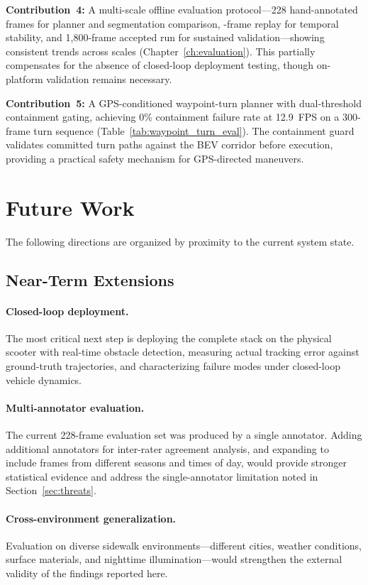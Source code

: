 \documentclass[12pt,letterpaper,oneside]{report}
\begin{document}
\textbf{Contribution~4:} A multi-scale offline evaluation protocol---228 hand-annotated frames for planner and segmentation comparison, -frame replay for temporal stability, and 1,800-frame accepted run for sustained validation---showing consistent trends across scales (Chapter~\ref{ch:evaluation}).  This partially compensates for the absence of closed-loop deployment testing, though on-platform validation remains necessary.

\textbf{Contribution~5:} A GPS-conditioned waypoint-turn planner with dual-threshold containment gating, achieving 0\% containment failure rate at 12.9~FPS on a 300-frame turn sequence (Table~\ref{tab:waypoint_turn_eval}).  The containment guard validates committed turn paths against the BEV corridor before execution, providing a practical safety mechanism for GPS-directed maneuvers.


\section{Future Work}

The following directions are organized by proximity to the current system state.

\subsection{Near-Term Extensions}

\paragraph{Closed-loop deployment.}  The most critical next step is deploying the complete stack on the physical scooter with real-time obstacle detection, measuring actual tracking error against ground-truth trajectories, and characterizing failure modes under closed-loop vehicle dynamics.

\paragraph{Multi-annotator evaluation.}  The current 228-frame evaluation set was produced by a single annotator.  Adding additional annotators for inter-rater agreement analysis, and expanding to include frames from different seasons and times of day, would provide stronger statistical evidence and address the single-annotator limitation noted in Section~\ref{sec:threats}.

\paragraph{Cross-environment generalization.}  Evaluation on diverse sidewalk environments---different cities, weather conditions, surface materials, and nighttime illumination---would strengthen the external validity of the findings reported here.
\end{document}
